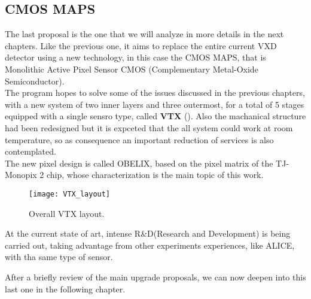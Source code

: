 \subsection{CMOS MAPS}

The last proposal is the one that we will analyze in more details in the next chapters. Like the previous one, it aims to replace the entire current VXD detector using a new technology, in this case the CMOS MAPS, that is Monolithic Active Pixel Sensor CMOS (Complementary Metal-Oxide Semiconductor). \\
The program hopes to solve some of the issues discussed in the previous chapters, with a new system of two inner layers and three outermost, for a total of 5 stages equipped with a single sensro type, called \textbf{VTX} (). Also the machanical structure had been redesigned but it is expceted that the all system could work at room temperature, so as consequence an important reduction of services is also contemplated.\\
The new pixel design is called OBELIX, based on the pixel matrix of the TJ-Monopix 2 chip, whose characterization is the main topic of this work. 

\begin{figure}[h!]
\centering
\texttt{[image: VTX\_layout]}
\caption{Overall VTX layout.}
\label{VTX_layout}
\end{figure}

At the current state of art, intense R\&D(Research and Development) is being carried out, taking advantage from other experiments experiences, like ALICE, with tha same type of sensor.

After a briefly review of the main upgrade proposals, we can now deepen into this last one in the following chapter.



\begin{comment}
SuperKEKB is already the world's highest-luminosity collider and it aims to reach a new peaks luminosity [of 6.3 $\dot 10^{35}$ $cm^{-2}s^{-1}$] in the future by further increasing the beam-currents and reducing the beam-size at the interaction point by squeezing the betatron function down to $\beta^{*}_{y}$ = 0.3 mm (mentioned in section REFERENCE). For this reason, it's necessary to understand how to mitigate the beam backgrounds where possible and how to cope with the consequent challenges. 
\end{comment}


\begin{comment}
[So it is a of a great importance simulate and measure the background to check on the state of the detector and the machine but also to predict how the conditions could change.]
In figure .... the Belle II background level measured in..... is shown. Current background rates in the experiment are acceptable and above all in most cases well below the limits (listed??). 
\end{comment}
